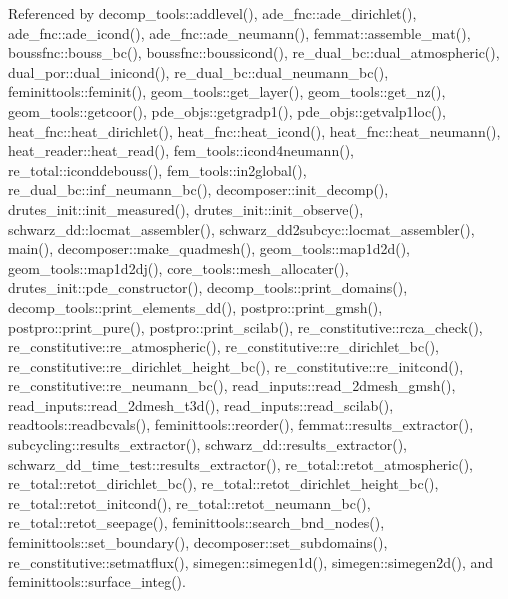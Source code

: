 Referenced by decomp\+\_\+tools\+::addlevel(), ade\+\_\+fnc\+::ade\+\_\+dirichlet(), ade\+\_\+fnc\+::ade\+\_\+icond(), ade\+\_\+fnc\+::ade\+\_\+neumann(), femmat\+::assemble\+\_\+mat(), boussfnc\+::bouss\+\_\+bc(), boussfnc\+::boussicond(), re\+\_\+dual\+\_\+bc\+::dual\+\_\+atmospheric(), dual\+\_\+por\+::dual\+\_\+inicond(), re\+\_\+dual\+\_\+bc\+::dual\+\_\+neumann\+\_\+bc(), feminittools\+::feminit(), geom\+\_\+tools\+::get\+\_\+layer(), geom\+\_\+tools\+::get\+\_\+nz(), geom\+\_\+tools\+::getcoor(), pde\+\_\+objs\+::getgradp1(), pde\+\_\+objs\+::getvalp1loc(), heat\+\_\+fnc\+::heat\+\_\+dirichlet(), heat\+\_\+fnc\+::heat\+\_\+icond(), heat\+\_\+fnc\+::heat\+\_\+neumann(), heat\+\_\+reader\+::heat\+\_\+read(), fem\+\_\+tools\+::icond4neumann(), re\+\_\+total\+::iconddebouss(), fem\+\_\+tools\+::in2global(), re\+\_\+dual\+\_\+bc\+::inf\+\_\+neumann\+\_\+bc(), decomposer\+::init\+\_\+decomp(), drutes\+\_\+init\+::init\+\_\+measured(), drutes\+\_\+init\+::init\+\_\+observe(), schwarz\+\_\+dd\+::locmat\+\_\+assembler(), schwarz\+\_\+dd2subcyc\+::locmat\+\_\+assembler(), main(), decomposer\+::make\+\_\+quadmesh(), geom\+\_\+tools\+::map1d2d(), geom\+\_\+tools\+::map1d2dj(), core\+\_\+tools\+::mesh\+\_\+allocater(), drutes\+\_\+init\+::pde\+\_\+constructor(), decomp\+\_\+tools\+::print\+\_\+domains(), decomp\+\_\+tools\+::print\+\_\+elements\+\_\+dd(), postpro\+::print\+\_\+gmsh(), postpro\+::print\+\_\+pure(), postpro\+::print\+\_\+scilab(), re\+\_\+constitutive\+::rcza\+\_\+check(), re\+\_\+constitutive\+::re\+\_\+atmospheric(), re\+\_\+constitutive\+::re\+\_\+dirichlet\+\_\+bc(), re\+\_\+constitutive\+::re\+\_\+dirichlet\+\_\+height\+\_\+bc(), re\+\_\+constitutive\+::re\+\_\+initcond(), re\+\_\+constitutive\+::re\+\_\+neumann\+\_\+bc(), read\+\_\+inputs\+::read\+\_\+2dmesh\+\_\+gmsh(), read\+\_\+inputs\+::read\+\_\+2dmesh\+\_\+t3d(), read\+\_\+inputs\+::read\+\_\+scilab(), readtools\+::readbcvals(), feminittools\+::reorder(), femmat\+::results\+\_\+extractor(), subcycling\+::results\+\_\+extractor(), schwarz\+\_\+dd\+::results\+\_\+extractor(), schwarz\+\_\+dd\+\_\+time\+\_\+test\+::results\+\_\+extractor(), re\+\_\+total\+::retot\+\_\+atmospheric(), re\+\_\+total\+::retot\+\_\+dirichlet\+\_\+bc(), re\+\_\+total\+::retot\+\_\+dirichlet\+\_\+height\+\_\+bc(), re\+\_\+total\+::retot\+\_\+initcond(), re\+\_\+total\+::retot\+\_\+neumann\+\_\+bc(), re\+\_\+total\+::retot\+\_\+seepage(), feminittools\+::search\+\_\+bnd\+\_\+nodes(), feminittools\+::set\+\_\+boundary(), decomposer\+::set\+\_\+subdomains(), re\+\_\+constitutive\+::setmatflux(), simegen\+::simegen1d(), simegen\+::simegen2d(), and feminittools\+::surface\+\_\+integ().


